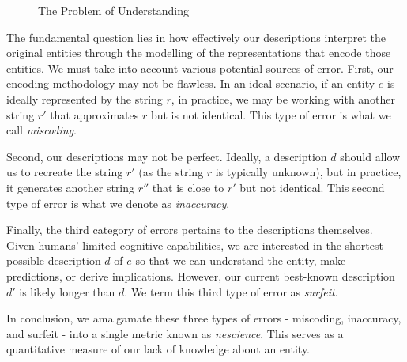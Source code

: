 
\begin{figure}[t]
\centering
{}
\caption{The Problem of Understanding}
\end{figure}

The fundamental question lies in how effectively our descriptions interpret the original entities through the modelling of the representations that encode those entities. We must take into account various potential sources of error. First, our encoding methodology may not be flawless. In an ideal scenario, if an entity $e$ is ideally represented by the string $r$, in practice, we may be working with another string $r'$ that approximates $r$ but is not identical. This type of error is what we call \emph{miscoding}.

Second, our descriptions may not be perfect. Ideally, a description $d$ should allow us to recreate the string $r'$ (as the string $r$ is typically unknown), but in practice, it generates another string $r''$ that is close to $r'$ but not identical. This second type of error is what we denote as \emph{inaccuracy}.

Finally, the third category of errors pertains to the descriptions themselves. Given humans' limited cognitive capabilities, we are interested in the shortest possible description $d$ of $e$ so that we can understand the entity, make predictions, or derive implications. However, our current best-known description $d'$ is likely longer than $d$. We term this third type of error as \emph{surfeit}. 

In conclusion, we amalgamate these three types of errors - miscoding, inaccuracy, and surfeit - into a single metric known as \emph{nescience}. This serves as a quantitative measure of our lack of knowledge about an entity.

